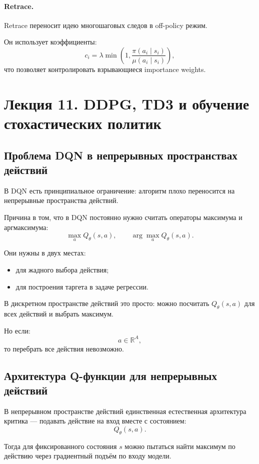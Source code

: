 \documentclass[12pt,a4paper]{article}
\begin{document}
\paragraph{Retrace.}

Retrace переносит идею многошаговых следов в off-policy режим.

Он использует коэффициенты:
\[
c_i
=
\lambda
\min
\left(
1,
\frac{
\pi(a_i\mid s_i)
}{
\mu(a_i\mid s_i)
}
\right),
\]
что позволяет контролировать взрывающиеся importance weights.



\section{Лекция 11. DDPG, TD3 и обучение стохастических политик}

\subsection{Проблема DQN в непрерывных пространствах действий}

В DQN есть принципиальное ограничение: алгоритм плохо переносится на непрерывные пространства действий.

Причина в том, что в DQN постоянно нужно считать операторы максимума и аргмаксимума:
\[
\max_a Q_\theta(s,a),
\qquad
\arg\max_a Q_\theta(s,a).
\]

Они нужны в двух местах:

\begin{itemize}
    \item для жадного выбора действия;
    \item для построения таргета в задаче регрессии.
\end{itemize}

В дискретном пространстве действий это просто: можно посчитать $Q_\theta(s,a)$ для всех действий и выбрать максимум.

Но если:
\[
a \in \mathbb R^A,
\]
то перебрать все действия невозможно.

\subsection{Архитектура Q-функции для непрерывных действий}

В непрерывном пространстве действий единственная естественная архитектура критика --- подавать действие на вход вместе с состоянием:
\[
Q_\theta(s,a).
\]

Тогда для фиксированного состояния $s$ можно пытаться найти максимум по действию через градиентный подъём по входу модели.
\end{document}
